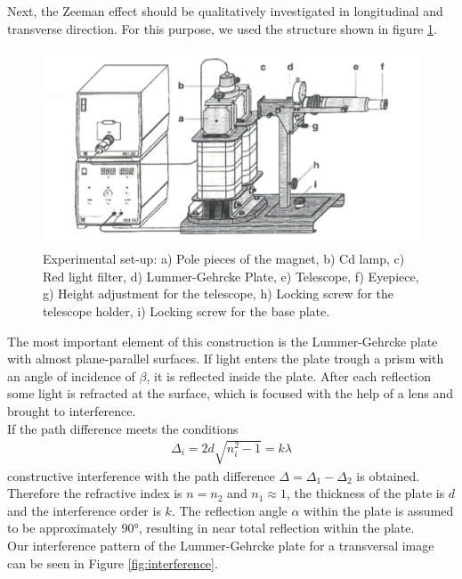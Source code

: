 Next, the Zeeman effect should be qualitatively investigated in longitudinal and transverse direction.
For this purpose, we used the structure shown in figure \ref{fig:structure}.
\begin{figure}[ht]
\centering
\includegraphics[scale=.9]{images//structure.png}
\caption{Experimental set-up: a) Pole pieces of the magnet, b) Cd lamp, c) Red light filter, d) Lummer-Gehrcke Plate, e) Telescope, f) Eyepiece, g) Height adjustment for the telescope, h) Locking screw for the telescope holder, i) Locking screw for the base plate. \cite{leaflets}}
\label{fig:structure}
\end{figure}
The most important element of this construction is the Lummer-Gehrcke plate with almost plane-parallel surfaces.
If light enters the plate trough a prism with an angle of incidence of $\beta$, it is reflected inside the plate.
After each reflection some light is refracted at the surface, which is focused with the help of a lens and brought to interference.\\
If the path difference meets the conditions
\begin{align}
\Delta_i = 2d\sqrt{n_i^2-1} = k \lambda
\end{align}
constructive interference with the path difference $\Delta=\Delta_1-\Delta_2$ is obtained. Therefore the refractive index is $n=n_2$ and $n_1\approx\num{1}$, the thickness of the plate is $d$ and the interference order is $k$.
The reflection angle $\alpha$ within the plate is assumed to be approximately $\ang{90}$, resulting in near total reflection within the plate.\\
Our interference pattern of the Lummer-Gehrcke plate for a transversal image can be seen in Figure \ref{fig:interference}.
